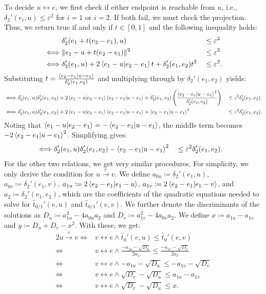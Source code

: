 To decide \(u \leftrightarrow e\), we first check if either endpoint is reachable from \(u\), i.e., \(\delta_2'(e_i, u) \leq \varepsilon^2\) for \(i = 1\) or \(i = 2\). If both fail, we must check the projection. Thus, we return true if and only if \(t \in [0, 1]\) and the following inequality holds:
\begin{alignat*}{3}
&\delta_2'(e_1 + t(e_2 - e_1), u) &&\leq \varepsilon^2 \\
  \iff& \|e_1 - u + t(e_2 - e_1)\|^2 &&\leq \varepsilon^2 \\
  \iff& \delta_2'(e_1, u) + 2\braket{e_1 - u | e_2 - e_1}t + \delta_2'(e_1, e_2)t^2 &&\leq \varepsilon^2.
\end{alignat*}
Substituting \(t = \frac{\braket{e_2 - e_1 | u - e_1}}{\delta_2'(e_1, e_2)}\) and multiplying through by \(\delta_2'(e_1, e_2)\) yields:
\begin{alignat*}{2}
  \iff& \delta_2'(e_1, u)\delta_2'(e_1, e_2) + 2\braket{e_1 - u | e_2 - e_1}\braket{e_2 - e_1 | u - e_1} + \delta_2'(e_1, e_2)\left(\frac{\braket{e_2 - e_1 | u - e_1}^2}{\delta_2'(e_1, e_2)}\right) &&\leq \varepsilon^2 \delta_2'(e_1, e_2) \\
  \iff& \delta_2'(e_1, u)\delta_2'(e_1, e_2) + 2\braket{e_1 - u | e_2 - e_1}\braket{e_2 - e_1 | u - e_1} + \braket{e_2 - e_1 | u - e_1}^2 &&\leq \varepsilon^2 \delta_2'(e_1, e_2).
\end{alignat*}
Noting that \(\braket{e_1 - u | e_2 - e_1} = -\braket{e_2 - e_1 | u - e_1}\), the middle term becomes \(-2\braket{e_2 - e_1 | u - e_1}^2\). Simplifying gives:
\begin{alignat*}{2}
  \iff& \delta_2'(e_1, u)\delta_2'(e_1, e_2) - \braket{e_2 - e_1 | u - e_1}^2 &&\leq \varepsilon^2 \delta_2'(e_1, e_2).
\end{alignat*}
For the other two relations, we get very similar procedures. For simplicity, we only derive the condition for \(u \overset e\rightarrow v\). We define \(a_{0u} \coloneq \delta_2'(e_1, u)\), \(a_{0v} \coloneq \delta_2'(e_1, v)\), \(a_{1u} \coloneq 2\braket{e_2 - e_1 | e_1 - u}\), \(a_{1v} \coloneq 2\braket{e_2 - e_1 | e_1 - v}\), and \(a_{2} \coloneq \delta_2'(e_1, e_2)\), which are the coefficients of the quadratic equations needed to solve for \(\hat t_{0/1}'(e, u)\) and \(\hat t_{0/1}'(e, v)\). We further denote the discriminants of the solutions as \(D_u \coloneq a_{1u}^2 - 4a_{0u}a_2\) and \(D_v \coloneq a_{1v}^2 - 4a_{0v}a_2\). We define \(x  \coloneq a_{1u} - a_{1v}\) and \(y \coloneq D_u + D_v - x^2\). With these, we get:
\begin{alignat*}{2}
  u \overset e\rightarrow v \iff& v \leftrightarrow e \land \hat t_0'(e, u) \leq \hat t_0'(e, v) \\
  \iff& v \leftrightarrow e \land \frac{-a_{1u} - \sqrt{D_u}}{2a_2} \leq \frac{-a_{1v} - \sqrt{D_v}}{2a_2} \\
  \iff& v \leftrightarrow e \land -a_{1u} - \sqrt{D_u} \leq -a_{1v} - \sqrt{D_v} \\
  \iff& v \leftrightarrow e \land \sqrt{D_v} - \sqrt{D_u} \leq a_{1u} - a_{1v}  \\
  \iff& v \leftrightarrow e \land \sqrt{D_v} - \sqrt{D_u} \leq x.
\end{alignat*}
